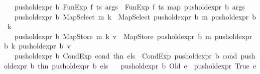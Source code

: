 \begin{isabellebody}
\ \ {\isacharbar}{\kern0pt}\ {\isachardoublequoteopen}push{\isacharunderscore}{\kern0pt}old{\isacharunderscore}{\kern0pt}expr\ b\ {\isacharparenleft}{\kern0pt}FunExp\ f\ ts\ args{\isacharparenright}{\kern0pt}\ {\isacharequal}{\kern0pt}\ FunExp\ f\ ts\ {\isacharparenleft}{\kern0pt}map\ {\isacharparenleft}{\kern0pt}push{\isacharunderscore}{\kern0pt}old{\isacharunderscore}{\kern0pt}expr\ b{\isacharparenright}{\kern0pt}\ args{\isacharparenright}{\kern0pt}{\isachardoublequoteclose}\isanewline
\ \ {\isacharbar}{\kern0pt}\ {\isachardoublequoteopen}push{\isacharunderscore}{\kern0pt}old{\isacharunderscore}{\kern0pt}expr\ b\ {\isacharparenleft}{\kern0pt}MapSelect\ m\ k{\isacharparenright}{\kern0pt}\ {\isacharequal}{\kern0pt}\ MapSelect\ {\isacharparenleft}{\kern0pt}push{\isacharunderscore}{\kern0pt}old{\isacharunderscore}{\kern0pt}expr\ b\ m{\isacharparenright}{\kern0pt}\ {\isacharparenleft}{\kern0pt}push{\isacharunderscore}{\kern0pt}old{\isacharunderscore}{\kern0pt}expr\ b\ k{\isacharparenright}{\kern0pt}{\isachardoublequoteclose}\isanewline
\ \ {\isacharbar}{\kern0pt}\ {\isachardoublequoteopen}push{\isacharunderscore}{\kern0pt}old{\isacharunderscore}{\kern0pt}expr\ b\ {\isacharparenleft}{\kern0pt}MapStore\ m\ k\ v{\isacharparenright}{\kern0pt}\ {\isacharequal}{\kern0pt}\ MapStore\ {\isacharparenleft}{\kern0pt}push{\isacharunderscore}{\kern0pt}old{\isacharunderscore}{\kern0pt}expr\ b\ m{\isacharparenright}{\kern0pt}\ {\isacharparenleft}{\kern0pt}push{\isacharunderscore}{\kern0pt}old{\isacharunderscore}{\kern0pt}expr\ b\ k{\isacharparenright}{\kern0pt}\ {\isacharparenleft}{\kern0pt}push{\isacharunderscore}{\kern0pt}old{\isacharunderscore}{\kern0pt}expr\ b\ v{\isacharparenright}{\kern0pt}{\isachardoublequoteclose}\isanewline
\ \ {\isacharbar}{\kern0pt}\ {\isachardoublequoteopen}push{\isacharunderscore}{\kern0pt}old{\isacharunderscore}{\kern0pt}expr\ b\ {\isacharparenleft}{\kern0pt}CondExp\ cond\ thn\ els{\isacharparenright}{\kern0pt}\ {\isacharequal}{\kern0pt}\ CondExp\ {\isacharparenleft}{\kern0pt}push{\isacharunderscore}{\kern0pt}old{\isacharunderscore}{\kern0pt}expr\ b\ cond{\isacharparenright}{\kern0pt}\ {\isacharparenleft}{\kern0pt}push{\isacharunderscore}{\kern0pt}old{\isacharunderscore}{\kern0pt}expr\ b\ thn{\isacharparenright}{\kern0pt}\ {\isacharparenleft}{\kern0pt}push{\isacharunderscore}{\kern0pt}old{\isacharunderscore}{\kern0pt}expr\ b\ els{\isacharparenright}{\kern0pt}{\isachardoublequoteclose}\isanewline
\ \ {\isacharbar}{\kern0pt}\ {\isachardoublequoteopen}push{\isacharunderscore}{\kern0pt}old{\isacharunderscore}{\kern0pt}expr\ b\ {\isacharparenleft}{\kern0pt}Old\ e{\isacharparenright}{\kern0pt}\ {\isacharequal}{\kern0pt}\ push{\isacharunderscore}{\kern0pt}old{\isacharunderscore}{\kern0pt}expr\ True\ e{\isachardoublequoteclose}\isanewline

\end{isabellebody}
